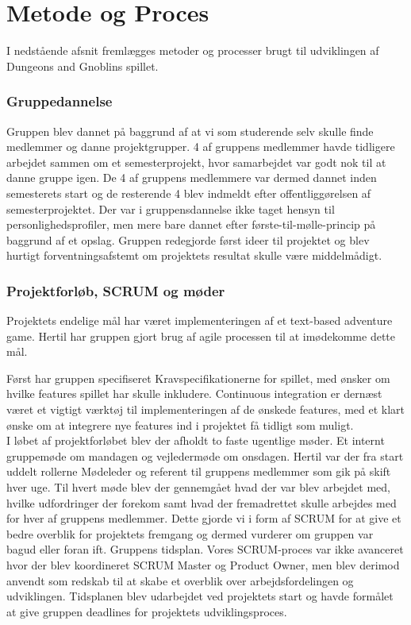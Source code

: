 \section{Metode og Proces}
I nedstående afsnit fremlægges metoder og processer brugt til udviklingen af
Dungeons and Gnoblins spillet.

\subsubsection{Gruppedannelse}
Gruppen blev dannet på baggrund af at vi som studerende selv skulle finde medlemmer og danne projektgrupper. 4 af gruppens medlemmer havde tidligere arbejdet sammen om et semesterprojekt, hvor samarbejdet var godt nok til at danne gruppe igen. De 4 af gruppens medlemmere var dermed dannet inden semesterets start og de resterende 4 blev indmeldt efter offentliggørelsen af semesterprojektet. Der var i gruppensdannelse ikke taget hensyn til personlighedsprofiler, men mere bare dannet efter første-til-mølle-princip på baggrund af et opslag. Gruppen redegjorde først ideer til projektet og blev hurtigt forventningsafstemt om projektets resultat skulle være middelmådigt. 

\subsubsection{Projektforløb, SCRUM og møder}
Projektets endelige mål har været implementeringen af et text-based adventure game.
Hertil har gruppen gjort brug af agile processen til at imødekomme dette mål.

Først har gruppen specifiseret Kravspecifikationerne for spillet, med ønsker om
hvilke features spillet har skulle inkludere. Continuous integration er dernæst
været et vigtigt værktøj til implementeringen af de ønskede features, med et klart
ønske om at integrere nye features ind i projektet få tidligt som muligt.\\

I løbet af projektforløbet blev der afholdt to faste ugentlige møder. Et internt gruppemøde om mandagen og vejledermøde om onsdagen. Hertil var der fra start uddelt rollerne Mødeleder og referent til gruppens medlemmer som gik på skift hver uge. Til hvert møde blev der gennemgået hvad der var blev arbejdet med, hvilke udfordringer der forekom samt hvad der fremadrettet skulle arbejdes med for hver af gruppens medlemmer. Dette gjorde vi i form af SCRUM for at give et bedre overblik for projektets fremgang og dermed vurderer om gruppen var bagud eller foran ift. Gruppens tidsplan. Vores SCRUM-proces var ikke avanceret hvor der blev koordineret SCRUM Master og Product Owner, men blev derimod anvendt som redskab til at skabe et overblik over arbejdsfordelingen og udviklingen. Tidsplanen blev udarbejdet ved projektets start og havde formålet at give gruppen deadlines for projektets udviklingsproces. 

